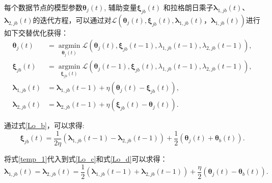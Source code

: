 每个数据节点的模型参数${\boldsymbol{\theta}_j}\left(t\right)$, 辅助变量$\boldsymbol{\xi}_{jb}\left(t\right)$
和拉格朗日乘子$\boldsymbol\lambda_{1,jb}\left(t\right)$、$\boldsymbol\lambda_{2,jb}\left(t\right)$的迭代方程，可以通过对$\mathcal{L}\left({\boldsymbol{\theta}_j}\left(t\right), \boldsymbol{\xi}_{jb}\left(t\right),
\boldsymbol\lambda_{1,jb}\left(t\right)， \boldsymbol\lambda_{1,jb}\left(t\right)\right)$进行如下交替优化获得：
\begin{subequations}
    \label{Lagrange_optimization}
    \begin{align}
        \boldsymbol{\theta}_j\left(t\right) &= \mathop{\arg\min}\limits_{\boldsymbol{\theta}_j\left(t\right)}\mathcal{L}\left({\boldsymbol{\theta}_j}\left(t\right), \boldsymbol{\xi}_{jb}\left(t-1\right),
        \lambda_{1,jb}\left(t-1\right), \lambda_{2,jb}\left(t-1\right)\right), \label{Lo_a} \\
        \boldsymbol{\xi}_{jb}\left(t\right) &= \mathop{\arg\min}\limits_{\boldsymbol{\xi}_{jb}\left(t\right)}\mathcal{L}\left({\boldsymbol{\theta}_j}\left(t-1\right), \boldsymbol{\xi}_{jb}\left(t\right), 
        \lambda_{1,jb}\left(t-1\right), \lambda_{2,jb}\left(t-1\right)\right), \label{Lo_b} \\
        \boldsymbol\lambda_{1,jb}\left(t\right) &= \boldsymbol\lambda_{1,jb}\left(t-1\right) + \eta\left({\boldsymbol{\theta}_j}\left(t\right) 
        - \boldsymbol{\xi}_{jb}\left(t\right)\right) , \label{Lo_c} \\
        \boldsymbol\lambda_{2,jb}\left(t\right) &= \boldsymbol\lambda_{2,jb}\left(t-1\right)
        + \eta\left(\boldsymbol{\xi}_{jb}\left(t\right) - {\boldsymbol{\theta}_j}\left(t\right) \right).  \label{Lo_d}
    \end{align}
\end{subequations}

通过式\eqref{Lo_b}，可以求得:
\begin{equation}
    \label{temp_1}
    \boldsymbol{\xi}_{jb}\left(t\right) = \frac{1}{2\eta}\left(\boldsymbol\lambda_{1,jb}\left(t-1\right) 
    - \boldsymbol\lambda_{2,jb}\left(t-1\right)\right) + \frac{1}{2}\left(\boldsymbol{\theta}_j\left(t\right) 
    + \boldsymbol{\theta}_b\left(t\right)\right).
\end{equation}

将式\eqref{temp_1}代入到式\eqref{Lo_c}和式\eqref{Lo_d}可以求得：
\begin{equation}
    \label{temp_2}
    \boldsymbol\lambda_{1,jb}\left(t\right) = \boldsymbol\lambda_{2,jb}\left(t\right) = \frac{1}{2}\left(\boldsymbol\lambda_{1,jb}\left(t-1\right) 
    + \boldsymbol\lambda_{2,jb}\left(t-1\right)\right) + \frac{\eta}{2}\left({\boldsymbol{\theta}_j}\left(t\right) - {\boldsymbol{\theta}_b}\left(t\right)\right).
\end{equation}

